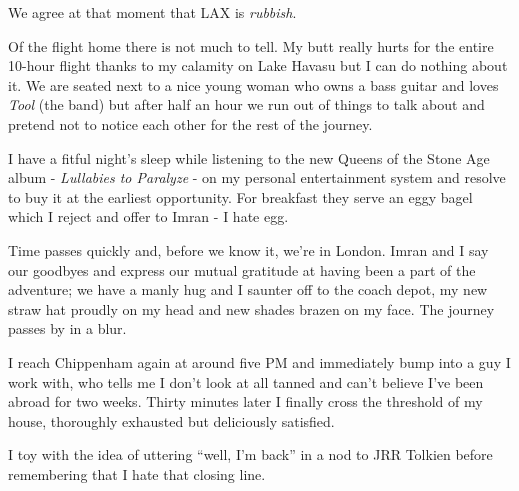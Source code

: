 \documentclass[a5paper,titlepage,11pt]{book}
\begin{document}
We agree at that moment that LAX is \emph{rubbish}.

Of the flight home there is not much to tell. My butt really hurts for the entire 10-hour flight thanks to my calamity on Lake Havasu but I can do nothing about it. We are seated next to a nice young woman who owns a bass guitar and loves \emph{Tool} (the band) but after half an hour we run out of things to talk about and pretend not to notice each other for the rest of the journey.

I have a fitful night's sleep while listening to the new Queens of the Stone Age album - \emph{Lullabies to Paralyze} - on my personal entertainment system and resolve to buy it at the earliest opportunity. For breakfast they serve an eggy bagel which I reject and offer to Imran - I hate egg.

Time passes quickly and, before we know it, we're in London. Imran and I say our goodbyes and express our mutual gratitude at having been a part of the adventure; we have a manly hug and I saunter off to the coach depot, my new straw hat proudly on my head and new shades brazen on my face. The journey passes by in a blur.

I reach Chippenham again at around five PM and immediately bump into a guy I work with, who tells me I don't look at all tanned and can't believe I've been abroad for two weeks. Thirty minutes later I finally cross the threshold of my house, thoroughly exhausted but deliciously satisfied.

I toy with the idea of uttering ``well, I'm back'' in a nod to JRR Tolkien before remembering that I hate that closing line.
\end{document}

